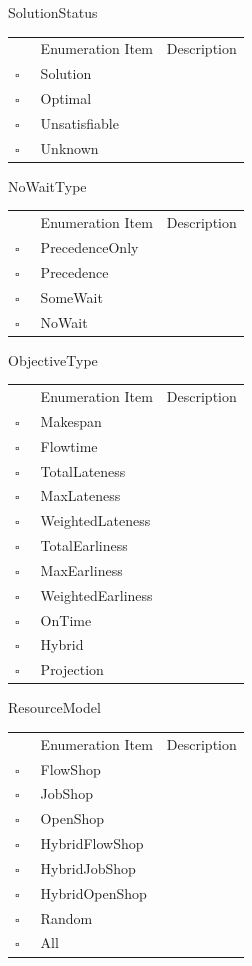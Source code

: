 SolutionStatus   
\begin{longtable}{llp{8cm}}
& Enumeration Item & Description \\
$\square$\ & Solution &  \\
$\square$\ & Optimal &  \\
$\square$\ & Unsatisfiable &  \\
$\square$\ & Unknown &  \\
\end{longtable}
NoWaitType   
\begin{longtable}{llp{8cm}}
& Enumeration Item & Description \\
$\square$\ & PrecedenceOnly &  \\
$\square$\ & Precedence &  \\
$\square$\ & SomeWait &  \\
$\square$\ & NoWait &  \\
\end{longtable}
ObjectiveType   
\begin{longtable}{llp{8cm}}
& Enumeration Item & Description \\
$\square$\ & Makespan &  \\
$\square$\ & Flowtime &  \\
$\square$\ & TotalLateness &  \\
$\square$\ & MaxLateness &  \\
$\square$\ & WeightedLateness &  \\
$\square$\ & TotalEarliness &  \\
$\square$\ & MaxEarliness &  \\
$\square$\ & WeightedEarliness &  \\
$\square$\ & OnTime &  \\
$\square$\ & Hybrid &  \\
$\square$\ & Projection &  \\
\end{longtable}
ResourceModel   
\begin{longtable}{llp{8cm}}
& Enumeration Item & Description \\
$\square$\ & FlowShop &  \\
$\square$\ & JobShop &  \\
$\square$\ & OpenShop &  \\
$\square$\ & HybridFlowShop &  \\
$\square$\ & HybridJobShop &  \\
$\square$\ & HybridOpenShop &  \\
$\square$\ & Random &  \\
$\square$\ & All &  \\
\end{longtable}
